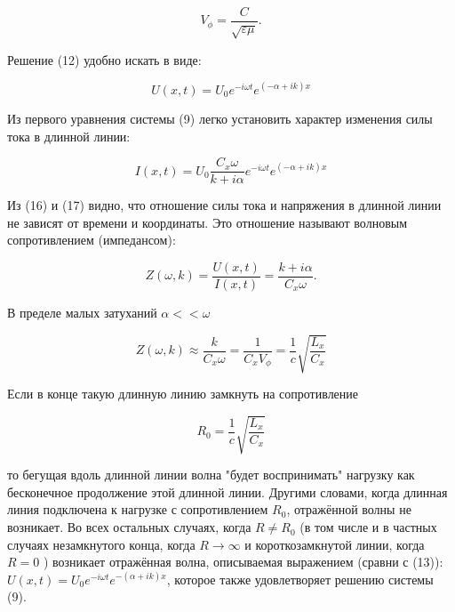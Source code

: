 \documentclass[a4paper,12 pt]{article}
\begin{document}
\begin{equation*}
V_{\phi}=\frac{C}{\sqrt{\varepsilon \mu}} . \tag{15}
\end{equation*}


Решение (12) удобно искать в виде:


\begin{equation*}
U(x, t)=U_{0} e^{-i \omega t} e^{(-\alpha+i k) x} \tag{16}
\end{equation*}


Из первого уравнения системы (9) легко установить характер изменения силы тока в длинной линии:


\begin{equation*}
I(x, t)=U_{0} \frac{C_{x} \omega}{k+i \alpha} e^{-i \omega t} e^{(-\alpha+i k) x} \tag{17}
\end{equation*}


Из (16) и (17) видно, что отношение силы тока и напряжения в длинной линии не зависят от времени и координаты. Это отношение называют волновым сопротивлением (импедансом):


\begin{equation*}
Z(\omega, k)=\frac{U(x, t)}{I(x, t)}=\frac{k+i \alpha}{C_{x} \omega} . \tag{18}
\end{equation*}


В пределе малых затуханий $\alpha<<\omega$


\begin{equation*}
Z(\omega, k) \approx \frac{k}{C_{x} \omega}=\frac{1}{C_{x} V_{\phi}}=\frac{1}{c} \sqrt{\frac{L_{x}}{C_{x}}} \tag{19}
\end{equation*}


Если в конце такую длинную линию замкнуть на сопротивление


\begin{equation*}
R_{0}=\frac{1}{c} \sqrt{\frac{L_{x}}{C_{x}}} \tag{20}
\end{equation*}


то бегущая вдоль длинной линии волна "будет воспринимать" нагрузку как бесконечное продолжение этой длинной линии. Другими словами, когда длинная линия подключена к нагрузке с сопротивлением $R_{0}$, отражённой волны не возникает. Во всех остальных случаях, когда $R \neq R_{0}$ (в том числе и в частных случаях незамкнутого конца, когда $R \rightarrow \infty$ и короткозамкнутой линии, когда $R=0$ ) возникает отражённая волна, описываемая выражением (сравни с (13)):\\
$U(x, t)=U_{0} e^{-i \omega t} e^{-(\alpha+i k) x}$, которое также удовлетворяет решению системы (9).
\end{document}
